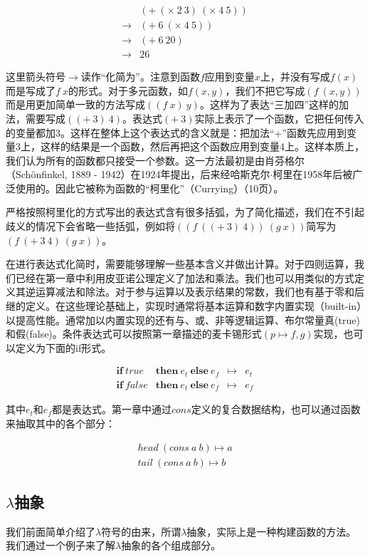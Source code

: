 \documentclass[b5paper]{ctexart}
\begin{document}
\[
\begin{array}{ll}
    & (+\ (\times\ 2\ 3)\ (\times\ 4\ 5)) \\
\to & (+\ 6\ (\times\ 4\ 5)) \\
\to & (+\ 6\ 20) \\
\to & 26
\end{array}
\]

这里箭头符号$\to$读作“化简为”。注意到函数$f$应用到变量$x$上，并没有写成$f(x)$而是写成了$f\ x$的形式。对于多元函数，如$f(x, y)$，我们不把它写成$(f\ (x, y))$而是用更加简单一致的方法写成$((f\ x)\ y)$。这样为了表达“三加四”这样的加法，需要写成$((+\ 3)\ 4)$。表达式$(+\ 3)$实际上表示了一个函数，它把任何传入的变量都加3。这样在整体上这个表达式的含义就是：把加法“+”函数先应用到变量3上，这样的结果是一个函数，然后再把这个函数应用到变量4上。这样本质上，我们认为所有的函数都只接受一个参数。这一方法最初是由肖芬格尔（Schönfinkel, 1889 - 1942）在1924年提出，后来经哈斯克尔$\cdot$柯里在1958年后被广泛使用的。因此它被称为函数的“柯里化”（Currying）\cite{SPJ1987}（10页）。

严格按照柯里化的方式写出的表达式含有很多括弧，为了简化描述，我们在不引起歧义的情况下会省略一些括弧，例如将$((f\ ((+\ 3)\ 4))\ (g\ x))$简写为$(f\ (+\ 3\ 4)\ (g\ x))$。

在进行表达式化简时，需要能够理解一些基本含义并做出计算。对于四则运算，我们已经在第一章中利用皮亚诺公理定义了加法和乘法。我们也可以用类似的方式定义其逆运算减法和除法。对于参与运算以及表示结果的常数，我们也有基于零和后继的定义。在这些理论基础上，实现时通常将基本运算和数字内置实现（built-in）以提高性能。通常加以内置实现的还有与、或、非等逻辑运算、布尔常量真(true)和假(false)。条件表达式可以按照第一章描述的麦卡锡形式$(p \mapsto f, g)$实现，也可以定义为下面的if形式。

\[
\begin{array}{llcl}
\textbf{if}\ true\! & \textbf{then}\ e_t\ \textbf{else}\ e_f & \mapsto & e_t \\
\textbf{if}\ false\! & \textbf{then}\ e_t\ \textbf{else}\ e_f & \mapsto & e_f
\end{array}
\]

其中$e_t$和$e_f$都是表达式。第一章中通过$cons$定义的复合数据结构，也可以通过函数来抽取其中的各个部分：

\[
\begin{array}{l}
head\ (cons\ a\ b) \mapsto a \\
tail\ (cons\ a\ b) \mapsto b
\end{array}
\]

\subsection{\texorpdfstring{$\lambda$}{λ}抽象}
我们前面简单介绍了$\lambda$符号的由来，所谓$\lambda$抽象，实际上是一种构建函数的方法。我们通过一个例子来了解$\lambda$抽象的各个组成部分。
\end{document}
